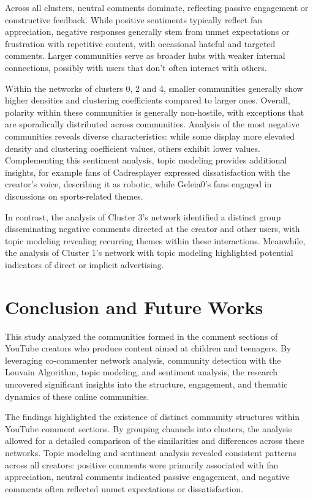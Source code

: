 \documentclass[12pt]{article}
\begin{document}
Across all clusters, neutral comments dominate, reflecting passive engagement or constructive feedback.
While positive sentiments typically reflect fan appreciation, 
negative responses generally stem from unmet expectations or frustration with repetitive content, with 
occasional hateful and targeted comments. 
Larger communities serve as broader hubs with weaker internal connections,
possibly with users that don't often interact with others.

Within the networks of clusters 0, 2 and 4, smaller communities generally show higher densities and 
clustering coefficients compared to larger ones. Overall, polarity within these communities is generally 
non-hostile, with exceptions that are sporadically distributed across communities. 
Analysis of the most negative communities reveals diverse characteristics: 
while some display more elevated density and clustering coefficient values, 
others exhibit lower values. Complementing this sentiment analysis, topic modeling provides additional insights,
for example fans of Cadresplayer expressed dissatisfaction with the creator's voice, 
describing it as robotic, while Geleia0's fans engaged in discussions on sports-related themes.

In contrast, the analysis of Cluster 3's network identified a distinct group disseminating negative 
comments directed at the creator and other users, with topic modeling revealing recurring themes within 
these interactions. Meanwhile, the analysis of Cluster 1's network with topic modeling highlighted 
potential indicators of direct or implicit advertising.

\section{Conclusion and Future Works}

This study analyzed the communities formed in the comment sections of YouTube creators who produce 
content aimed at children and teenagers. By leveraging co-commenter network analysis, community detection 
with the Louvain Algorithm, topic modeling, and sentiment analysis, the research uncovered significant 
insights into the structure, engagement, and thematic dynamics of these online communities.

The findings highlighted the existence of distinct community structures within YouTube comment sections. 
By grouping channels into clusters, the analysis allowed for a detailed comparison of the similarities 
and differences across these networks. Topic modeling and sentiment analysis revealed consistent 
patterns across all creators: positive comments were primarily associated with fan appreciation, 
neutral comments indicated passive engagement, and negative comments often reflected unmet expectations 
or dissatisfaction. 
\end{document}
